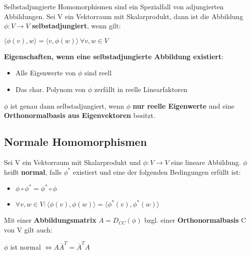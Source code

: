 \documentclass[10pt,a4paper]{article}
\begin{document}
	Selbstadjungierte Homomorphismen sind ein Spezialfall von adjungierten Abbildungen. Sei V ein Vektorraum mit Skalarprodukt, dann ist die Abbildung $\phi: V \rightarrow V$ \textbf{selbstadjungiert}, wenn gilt:
	\begin{center}
		$\langle \phi(v), w\rangle = \langle v, \phi(w)\rangle\ \forall v, w\in V$
	\end{center}
	\textbf{Eigenschaften, wenn eine selbstadjungierte Abbildung existiert}:
	\begin{itemize}
		\item Alle Eigenwerte von $\phi$ sind reell
		\item Das char. Polynom von $\phi$ zerfällt in reelle Linearfaktoren
	\end{itemize}
	$\phi$ ist genau dann selbstadjungiert, wenn $\phi$ \textbf{nur reelle Eigenwerte} und eine \textbf{Orthonormalbasis aus Eigenvektoren} besitzt.

	\subsection{Normale Homomorphismen}
	\label{aa:sub:normale_homomorphismen}

	Sei V ein Vektorraum mit Skalarprodukt und $\phi: V \rightarrow V$ eine lineare Abbildung. $\phi$ heißt \textbf{normal}, falls $\phi^*$ existiert und eine der folgenden Bedingungen erfüllt ist:
	\begin{itemize}
		\item $\phi \circ \phi^* = \phi^* \circ \phi$
		\item $\forall v,w \in V: \langle \phi(v), \phi(w)\rangle = \langle \phi^*(v), \phi^*(w)\rangle$
	\end{itemize}
	Mit einer \textbf{Abbildungsmatrix} $A = D_{CC}(\phi)$ bzgl. einer \textbf{Orthonormalbasis} C von V gilt auch:
	\begin{center}
		$\phi$ ist normal $\Leftrightarrow A \overline{A}^T = \overline{A}^TA$
	\end{center}
\end{document}
